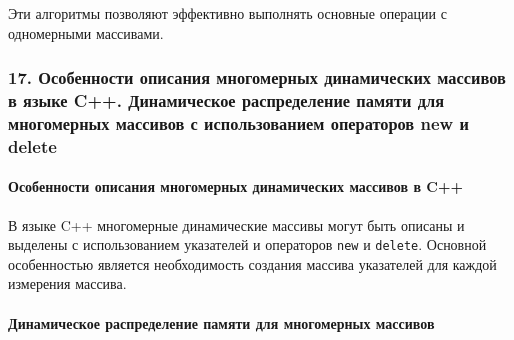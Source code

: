 \documentclass[
]{article}
\begin{document}
Эти алгоритмы позволяют эффективно выполнять основные операции с
одномерными массивами.

\subsubsection{17. Особенности описания многомерных динамических
массивов в языке C++. Динамическое распределение памяти для многомерных
массивов с использованием операторов new и
delete}\label{ux43eux441ux43eux431ux435ux43dux43dux43eux441ux442ux438-ux43eux43fux438ux441ux430ux43dux438ux44f-ux43cux43dux43eux433ux43eux43cux435ux440ux43dux44bux445-ux434ux438ux43dux430ux43cux438ux447ux435ux441ux43aux438ux445-ux43cux430ux441ux441ux438ux432ux43eux432-ux432-ux44fux437ux44bux43aux435-c.-ux434ux438ux43dux430ux43cux438ux447ux435ux441ux43aux43eux435-ux440ux430ux441ux43fux440ux435ux434ux435ux43bux435ux43dux438ux435-ux43fux430ux43cux44fux442ux438-ux434ux43bux44f-ux43cux43dux43eux433ux43eux43cux435ux440ux43dux44bux445-ux43cux430ux441ux441ux438ux432ux43eux432-ux441-ux438ux441ux43fux43eux43bux44cux437ux43eux432ux430ux43dux438ux435ux43c-ux43eux43fux435ux440ux430ux442ux43eux440ux43eux432-new-ux438-delete}

\paragraph{Особенности описания многомерных динамических массивов в
C++}\label{ux43eux441ux43eux431ux435ux43dux43dux43eux441ux442ux438-ux43eux43fux438ux441ux430ux43dux438ux44f-ux43cux43dux43eux433ux43eux43cux435ux440ux43dux44bux445-ux434ux438ux43dux430ux43cux438ux447ux435ux441ux43aux438ux445-ux43cux430ux441ux441ux438ux432ux43eux432-ux432-c}

В языке C++ многомерные динамические массивы могут быть описаны и
выделены с использованием указателей и операторов \texttt{new} и
\texttt{delete}. Основной особенностью является необходимость создания
массива указателей для каждой измерения массива.

\paragraph{Динамическое распределение памяти для многомерных
массивов}\label{ux434ux438ux43dux430ux43cux438ux447ux435ux441ux43aux43eux435-ux440ux430ux441ux43fux440ux435ux434ux435ux43bux435ux43dux438ux435-ux43fux430ux43cux44fux442ux438-ux434ux43bux44f-ux43cux43dux43eux433ux43eux43cux435ux440ux43dux44bux445-ux43cux430ux441ux441ux438ux432ux43eux432}
\end{document}
